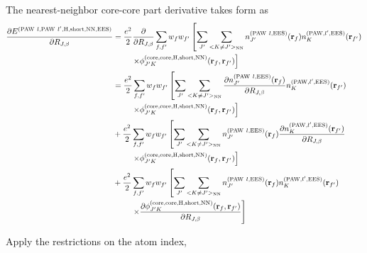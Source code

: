 \documentclass[paper=a4, fontsize=11pt]{article} %
\numberwithin{equation}{section} %
\numberwithin{figure}{section} %
\numberwithin{table}{section} %
\newcommand{\p}{\partial}
\newcommand{\br}{{\bf{r}}}
\newcommand{\rEES}{{\mathrm{EES}}}
\newcommand{\rcore}{{\mathrm{core}}}
\newcommand{\rNN}{{\mathrm{NN}}}
\newcommand{\rshort}{{\mathrm{short}}}
\newcommand{\rP}{{\mathrm{PAW}}}
\newcommand{\rH}{{\mathrm{H}}}
\newcommand{\RJb}{{R_{J,\beta}}}
\begin{document}
The nearest-neighbor core-core part derivative takes form as
\begin{equation}
\begin{split}
\frac{\p E^{(\rP\ l,\rP\ l',\rH,\rshort,\rNN,\rEES)}}{\p \RJb}
&= \frac{e^2}{2}\frac{\p }{\p \RJb}\sum_{f,f'} w_f w_{f'} \left[\sum_{J'} \sum_{<K \neq J'>_\rNN}n_{J'}^{(\rP\ l,\rEES)}(\br_f) n_K^{(\rP,l',\rEES)}(\br_{f'}) \right.\\ 
&\left.\ \ \ \ \ \ \ \times \phi_{J'K}^{(\rcore,\rcore,\rH,\rshort,\rNN)}(\br_f,\br_{f'})\right]\\
&= \frac{e^2}{2}\sum_{f,f'} w_f w_{f'} \left[\sum_{J'} \sum_{<K \neq J'>_\rNN}\frac{\p n_{J'}^{(\rP\ l,\rEES)}(\br_f)}{\p \RJb} n_K^{(\rP,l',\rEES)}(\br_{f'}) \right.\\ 
&\left.\ \ \ \ \ \ \ \times \phi_{J'K}^{(\rcore,\rcore,\rH,\rshort,\rNN)}(\br_f,\br_{f'})\right]\\
&+ \frac{e^2}{2}\sum_{f,f'} w_f w_{f'} \left[\sum_{J'} \sum_{<K \neq J'>_\rNN}n_{J'}^{(\rP\ l,\rEES)}(\br_f)\frac{\p n_K^{(\rP,l',\rEES)}(\br_{f'})}{\p \RJb}  \right.\\ 
&\left.\ \ \ \ \ \ \ \times \phi_{J'K}^{(\rcore,\rcore,\rH,\rshort,\rNN)}(\br_f,\br_{f'})\right]\\
&+ \frac{e^2}{2}\sum_{f,f'} w_f w_{f'} \left[\sum_{J'} \sum_{<K \neq J'>_\rNN}n_{J'}^{(\rP\ l,\rEES)}(\br_f) n_K^{(\rP,l',\rEES)}(\br_{f'}) \right.\\ 
&\left.\ \ \ \ \ \ \ \times \frac{\p \phi_{J'K}^{(\rcore,\rcore,\rH,\rshort,\rNN)}(\br_f,\br_{f'})}{\p \RJb}\right] \nonumber
\end{split}
\end{equation}

Apply the restrictions on the atom index,
\end{document}

